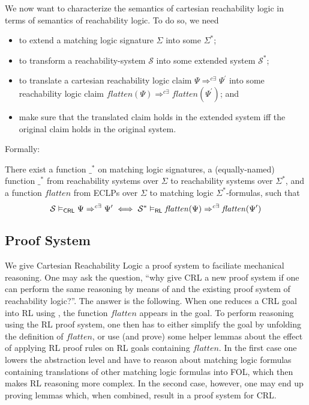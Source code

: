 We now want to characterize the semantics of cartesian reachability logic in terms of semantics of reachability logic.
To do so, we need
\begin{itemize}
    \item to extend a matching logic signature $\Sigma$ into some $\Sigma^*$;
    \item to transform a reachability-system $\mathcal{S}$ into some extended system $\mathcal{S}^*$; 
    \item to translate a cartesian reachability logic claim $\Psi \Rightarrow^{c\exists} \Psi^\prime$
    into some reachability logic claim $\mathit{flatten}(\Psi) \Rightarrow^{c\exists} \mathit{flatten}(\Psi^\prime)$; and
    \item make sure that the translated claim holds in the extended system iff the original claim holds in the original system.
\end{itemize}
Formally:
\begin{theorem}\label{thm:CRLandRLcorrespondence}
There exist a function $\_^*$ on matching logic signatures,
a (equally-named) function $\_^*$ from reachability systems over $\Sigma$ to reachability systems over $\Sigma^*$,
and a function $\mathit{flatten}$ from ECLPs over $\Sigma$ to matching logic $\Sigma^*$-formulas,
such that
\begin{equation*}
\mathcal{S} \vDash_{\mathsf{CRL}} \Psi \Rightarrow^{c\exists} \Psi^\prime
  \iff \mathcal{S}^* \vDash_{\mathsf{RL}} \mathit{flatten}(\Psi) \Rightarrow^{c\exists} \mathit{flatten}(\Psi^\prime)
\end{equation*}
\end{theorem}


\subsection{Proof System}

We give Cartesian Reachability Logic a proof system to faciliate mechanical reasoning.
One may ask the question, ``why give CRL a new proof system if one can perform the same reasoning
by means of  and the existing proof system of reachability logic?''.
The answer is the following.
When one reduces a CRL goal into RL using ,
the function $\mathit{flatten}$ appears in the goal.
To perform reasoning using the RL proof system, one then has to either simplify the goal
by unfolding the definition of $\mathit{flatten}$,
or use (and prove) some helper lemmas about the effect of applying RL proof rules
on RL goals containing $\mathit{flatten}$.
In the first case one lowers the abstraction level and have to reason about matching logic formulas
containing translations of other matching logic formulas into FOL, which then makes RL reasoning more complex.
In the second case, however, one may end up proving lemmas which, when combined, result in a proof system for CRL.

